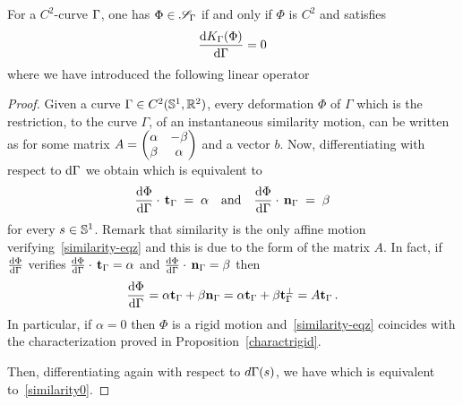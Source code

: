 \begin{prop}\label{similitude}
	For a $C^2$-curve $\Gamma$, one has $\Phi \in \mathcal{S}_\Gamma$ if and only if $\Phi$ is $C^2$ and satisfies 
\begin{equation}\label{similarity0}
		\frac{\mathrm{d} K_\Gamma(\Phi)}{\mathrm{d}\Gamma} = 0
		\end{equation}
	where we have introduced the following linear operator 
\end{prop}

\begin{proof}
Given a curve $\Gamma\in C^2(\mathbb{S}^1,\mathbb{R}^2)$, every   deformation $\Phi$ of $\Gamma$ which is the restriction, to the curve $\Gamma$,  of an instantaneous similarity motion, can be written as
for some matrix $A=\begin{pmatrix}
\alpha& -\beta\\
\beta&\alpha\\
\end{pmatrix} $ and a vector $b$.
Now, differentiating with respect to $\mathrm{d} \Gamma$ we obtain
which is equivalent to  
\begin{equation}\label{similarity-eqz}
	\frac{\mathrm{d} \Phi}{\mathrm{d}\Gamma}  \cdot\, \mathbf{t}_\Gamma \; = \; 
	 \alpha 
	\quad \text{and} \quad
	\frac{\mathrm{d} \Phi}{\mathrm{d}\Gamma}  \cdot\, \mathbf{n}_\Gamma \; = \; 
	 \beta
\end{equation}
for every $s\in \mathbb{S}^1$. Remark that similarity  is the only affine motion verifying~\eqref{similarity-eqz} and this is due to the form of the matrix $A$. In fact, if $\frac{\mathrm{d} \Phi}{\mathrm{d}\Gamma} $ verifies $\frac{\mathrm{d} \Phi}{\mathrm{d}\Gamma}  \cdot\, \mathbf{t}_\Gamma = \alpha$ and $\frac{\mathrm{d} \Phi}{\mathrm{d}\Gamma}  \cdot\, \mathbf{n}_\Gamma= \beta$ then
$$\frac{\mathrm{d} \Phi}{\mathrm{d}\Gamma} = \alpha \mathbf{t}_\Gamma + \beta \mathbf{n}_\Gamma = \alpha \mathbf{t}_\Gamma + \beta \mathbf{t}_\Gamma^\bot = A\mathbf{t}_\Gamma\,.$$ 
In particular, if $\alpha = 0$ then $\Phi$ is a rigid motion and~\eqref{similarity-eqz} coincides with the characterization proved in Proposition~\ref{charactrigid}.

Then, differentiating again with respect to $d \Gamma(s)$, we have
which is equivalent to~\eqref{similarity0}.
\end{proof}

